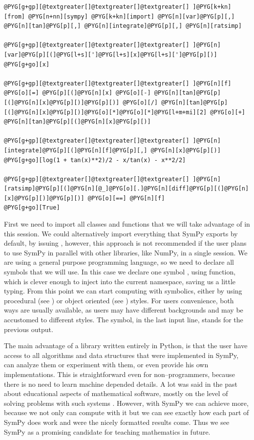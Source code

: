 \begin{Verbatim}[commandchars=@\[\]]
@PYG[g+gp][@textgreater[]@textgreater[]@textgreater[] ]@PYG[k+kn][from] @PYG[n+nn][sympy] @PYG[k+kn][import] @PYG[n][var]@PYG[p][,] @PYG[n][tan]@PYG[p][,] @PYG[n][integrate]@PYG[p][,] @PYG[n][ratsimp]

@PYG[g+gp][@textgreater[]@textgreater[]@textgreater[] ]@PYG[n][var]@PYG[p][(]@PYG[l+s][']@PYG[l+s][x]@PYG[l+s][']@PYG[p][)]
@PYG[g+go][x]

@PYG[g+gp][@textgreater[]@textgreater[]@textgreater[] ]@PYG[n][f] @PYG[o][=] @PYG[p][(]@PYG[n][x] @PYG[o][-] @PYG[n][tan]@PYG[p][(]@PYG[n][x]@PYG[p][)]@PYG[p][)] @PYG[o][/] @PYG[n][tan]@PYG[p][(]@PYG[n][x]@PYG[p][)]@PYG[o][*]@PYG[o][*]@PYG[l+m+mi][2] @PYG[o][+] @PYG[n][tan]@PYG[p][(]@PYG[n][x]@PYG[p][)]

@PYG[g+gp][@textgreater[]@textgreater[]@textgreater[] ]@PYG[n][integrate]@PYG[p][(]@PYG[n][f]@PYG[p][,] @PYG[n][x]@PYG[p][)]
@PYG[g+go][log(1 + tan(x)**2)/2 - x/tan(x) - x**2/2]

@PYG[g+gp][@textgreater[]@textgreater[]@textgreater[] ]@PYG[n][ratsimp]@PYG[p][(]@PYG[n][@_]@PYG[o][.]@PYG[n][diff]@PYG[p][(]@PYG[n][x]@PYG[p][)]@PYG[p][)] @PYG[o][==] @PYG[n][f]
@PYG[g+go][True]
\end{Verbatim}
\noindent
First we need to import all classes and functions that we will take advantage of in this
session. We could alternatively import everything that SymPy exports by default, by issuing
, however, this approach is not recommended if the user plans to use
SymPy in parallel with other libraries, like NumPy, in a single session. We are using a
general purpose programming language, so we need to declare all symbols that we will use.
In this case we declare one symbol , using  function, which is clever enough
to inject  into the current namespace, saving us a little typing. From this point we can
start computing with symbolics, either by using procedural (see ) or object
oriented (see ) styles. For users convenience, both ways are usually available,
as users may have different backgrounds and may be accustomed to different styles. The \code{\_}
symbol, in the last input line, stands for the previous output.

The main advantage of a library written entirely in Python, is that the user have access
to all algorithms and data structures that were implemented in SymPy, can analyze them
or experiment with them, or even provide his own implementations. This is straightforward
even for non--programmers, because there is no need to learn machine depended details. A
lot was said in the past about educational aspects of mathematical software, mostly on the
level of solving problems with such systems \cite{Wang1976teaching}. However, with SymPy we
can achieve more, because we not only can compute with it but we can see exactly how each
part of SymPy does work and were the nicely formatted results come. Thus we see SymPy
as a promising candidate for teaching mathematics in future.

